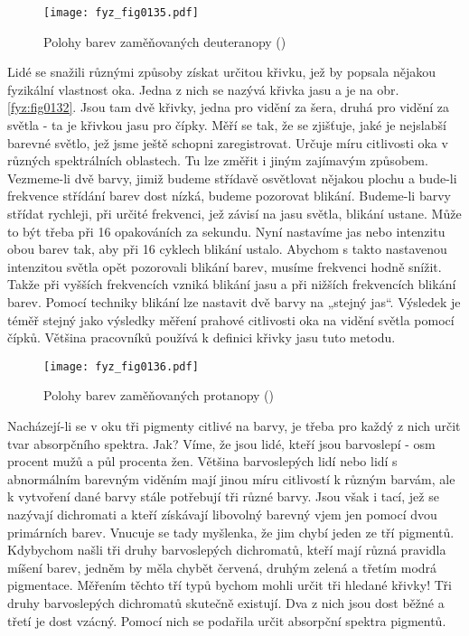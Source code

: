     \begin{figure}[ht!]   %
      \centering
      \texttt{[image: fyz\_fig0135.pdf]}
      \caption{Polohy barev zaměňovaných deuteranopy
              (\cite[s.~476]{Feynman01})}
      \label{fyz:fig0135}
    \end{figure}
    Lidé se snažili různými způsoby získat určitou křivku, jež by popsala 
    nějakou fyzikální vlastnost oka. Jedna z nich se nazývá křivka jasu a je na obr. 
    \ref{fyz:fig0132}. Jsou tam dvě křivky, jedna pro vidění za šera, druhá pro vidění za světla - 
    ta je křivkou jasu pro čípky. Měří se tak, že se zjišťuje, jaké je nejslabší barevné světlo, 
    jež jsme ještě schopni zaregistrovat. Určuje míru citlivosti oka v různých spektrálních 
    oblastech. Tu lze změřit i jiným zajímavým způsobem. Vezmeme-li dvě barvy, jimiž budeme 
    střídavě osvětlovat nějakou plochu a bude-li frekvence střídání barev dost nízká, budeme 
    pozorovat blikání. Budeme-li barvy střídat rychleji, při určité frekvenci, jež závisí na jasu 
    světla, blikání ustane. Může to být třeba při \num{16} opakováních za sekundu. Nyní nastavíme 
    jas nebo intenzitu obou barev tak, aby při \num{16} cyklech blikání ustalo. Abychom s takto 
    nastavenou intenzitou světla opět pozorovali blikání barev, musíme frekvenci hodně snížit. 
    Takže při vyšších frekvencích vzniká blikání jasu a při nižších frekvencích blikání barev. 
    Pomocí techniky blikání lze nastavit dvě barvy na „stejný jas“. Výsledek je téměř stejný jako 
    výsledky měření prahové citlivosti oka na vidění světla pomocí čípků. Většina pracovníků 
    používá k definici křivky jasu tuto metodu.

    \begin{figure}[ht!]  %
      \centering
      \texttt{[image: fyz\_fig0136.pdf]}
      \caption{Polohy barev zaměňovaných protanopy
              (\cite[s.~477]{Feynman01})}
      \label{fyz:fig0136}
    \end{figure}
    Nacházejí-li se v oku tři pigmenty citlivé na barvy, je třeba pro každý z nich určit tvar 
    absorpčního spektra. Jak? Víme, že jsou lidé, kteří jsou barvoslepí - osm procent mužů a půl 
    procenta žen. Většina barvoslepých lidí nebo lidí s abnormálním barevným viděním mají jinou 
    míru citlivostí k různým barvám, ale k vytvoření dané barvy stále potřebují tři různé barvy. 
    Jsou však i tací, jež se nazývají dichromati a kteří získávají libovolný barevný vjem jen 
    pomocí dvou primárních barev. Vnucuje se tady myšlenka, že jim chybí jeden ze tří pigmentů. 
    Kdybychom našli tři druhy barvoslepých dichromatů, kteří mají různá pravidla míšení barev, 
    jedněm by měla chybět červená, druhým zelená a třetím modrá pigmentace. Měřením těchto tří typů 
    bychom mohli určit tři hledané křivky! Tři druhy barvoslepých dichromatů skutečně existují. Dva 
    z nich jsou dost běžné a třetí je dost vzácný. Pomocí nich se podařila určit absorpční spektra 
    pigmentů.

